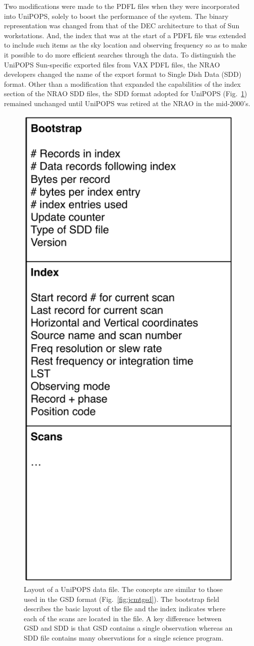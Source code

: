 \documentclass[final,authoryear,5p,times,twocolumn]{elsarticle}
\begin{document}
Two modifications were made to the PDFL files when they were
incorporated into UniPOPS, solely to boost the performance of the
system.  The binary representation was changed from that of the DEC
architecture to that of Sun workstations.  And, the index that was at
the start of a PDFL file was extended to include such items as the sky
location and observing frequency so as to make it possible to do more
efficient searches through the data.  To distinguish the UniPOPS
Sun-specific exported files from VAX PDFL files, the NRAO developers
changed the name of the export format to Single Dish Data (SDD) format.
Other than a modification that expanded the capabilities of the index
section of the NRAO SDD files, the SDD format adopted for UniPOPS
(Fig.~\ref{fig:nraosdd}) remained unchanged until UniPOPS was retired
at the NRAO in the mid-2000's.

\begin{figure}[t]
\begin{center}
\includegraphics[width=0.5\columnwidth]{sdd-file-layout}
\end{center}
\caption{Layout of a UniPOPS data file. The concepts are similar to
  those used in the GSD format (Fig.~\ref{fig:jcmtgsd}). The bootstrap
  field describes the basic layout of the file and the index indicates
  where each of the scans are located in the file. A key difference
  between GSD and SDD is that GSD contains a single observation
  whereas an SDD file contains many observations for a single science
  program.}
\label{fig:nraosdd}
\end{figure}
\end{document}
